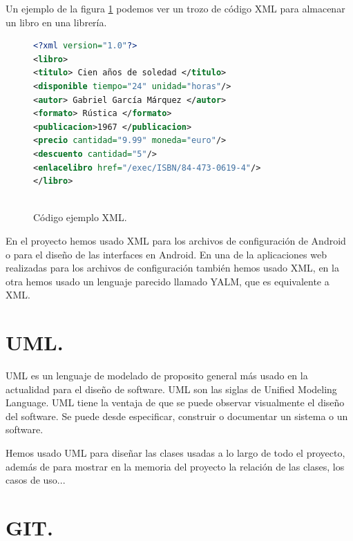 Un ejemplo de la figura \ref{cod:XML} podemos ver un trozo de código XML para almacenar un libro en una librería.

\begin{figure}
\begin{small}
 \begin{center}

    
  \begin{lstlisting}[language=XML]   
<?xml version="1.0"?>
<libro>
<titulo> Cien años de soledad </titulo>
<disponible tiempo="24" unidad="horas"/>
<autor> Gabriel García Márquez </autor>
<formato> Rústica </formato>
<publicacion>1967 </publicacion>
<precio cantidad="9.99" moneda="euro"/>
<descuento cantidad="5"/>
<enlacelibro href="/exec/ISBN/84-473-0619-4"/>
</libro>
    
  \end{lstlisting}

\end{center}
\end{small}
  
  \caption{Código ejemplo XML.}
  \label{cod:XML}
\end{figure}

En el proyecto hemos usado XML para los archivos de configuración de Android o para el diseño de las interfaces en Android. En una de la aplicaciones web realizadas para los archivos de configuración también hemos usado XML, en la otra hemos usado un lenguaje parecido llamado YALM, que es equivalente a XML.

\section{UML.}

UML es un lenguaje de modelado de proposito general más usado en la actualidad para el diseño de software. UML son las siglas de Unified Modeling Language. UML tiene la ventaja de que se puede observar visualmente el diseño del software. Se puede desde especificar, construir o documentar un sistema o un software.


Hemos usado UML para diseñar las clases usadas a lo largo de todo el proyecto, además de para mostrar en la memoria del proyecto la relación de las clases, los casos de uso...

\section{GIT.}

